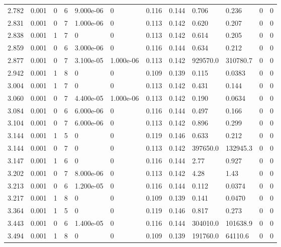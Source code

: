 \documentclass[preview]{standalone}
\begin{document}
{{{\begin{tabular}{L{1.2cm}C{1.2cm} C{0.3cm}C{0.5cm} C{1.4cm}C{1.4cm} C{1.4cm}C{1.4cm} C{1.6cm}C{1.6cm} C{1.6cm}C{1.6cm}}
  2.782  &  0.001  & 0     &  6 &  9.000e-06  & 0  &  0.116&   0.144& 0.706 & 0.236   &  0 & 0  \\ 
  2.831  &  0.001  & 0     &  7 &  1.000e-06  & 0  &  0.113&   0.142& 0.620 & 0.207   &  0 & 0  \\ 
  2.838  &  0.001  & 1     &  7 &  0  & 0  &  0.113&   0.142& 0.614 & 0.205   &  0 & 0  \\ 
  2.859  &  0.001  & 0     &  6 &  3.000e-06  & 0  &  0.116&   0.144& 0.634 & 0.212   &  0 & 0  \\ 
  2.877  &  0.001  & 0     &  7 &  3.100e-05  & 1.000e-06  &  0.113&   0.142& 929570.0 & 310780.7   &  0 & 0  \\ 
  2.942  &  0.001  & 1     &  8 &  0  & 0  &  0.109&   0.139& 0.115 & 0.0383   &  0 & 0  \\ 
  3.004  &  0.001  & 1     &  7 &  0  & 0  &  0.113&   0.142& 0.431 & 0.144   &  0 & 0  \\ 
  3.060  &  0.001  & 0     &  7 &  4.400e-05  & 1.000e-06  &  0.113&   0.142& 0.190 & 0.0634   &  0 & 0  \\ 
  3.084  &  0.001  & 0     &  6 &  6.000e-06  & 0  &  0.116&   0.144& 0.497 & 0.166   &  0 & 0  \\ 
  3.104  &  0.001  & 0     &  7 &  6.000e-06  & 0  &  0.113&   0.142& 0.896 & 0.299   &  0 & 0  \\ 
  3.144  &  0.001  & 1     &  5 &  0  & 0  &  0.119&   0.146& 0.633 & 0.212   &  0 & 0  \\ 
  3.144  &  0.001  & 0     &  7 &  0  & 0  &  0.113&   0.142& 397650.0 & 132945.3   &  0 & 0  \\ 
  3.147  &  0.001  & 1     &  6 &  0  & 0  &  0.116&   0.144& 2.77 & 0.927   &  0 & 0  \\ 
  3.202  &  0.001  & 0     &  7 &  8.000e-06  & 0  &  0.113&   0.142& 4.28 & 1.43   &  0 & 0  \\ 
  3.213  &  0.001  & 0     &  6 &  1.200e-05  & 0  &  0.116&   0.144& 0.112 & 0.0374   &  0 & 0  \\ 
  3.217  &  0.001  & 1     &  8 &  0  & 0  &  0.109&   0.139& 0.141 & 0.0470   &  0 & 0  \\ 
  3.364  &  0.001  & 1     &  5 &  0  & 0  &  0.119&   0.146& 0.817 & 0.273   &  0 & 0  \\ 
  3.443  &  0.001  & 0     &  6 &  1.400e-05  & 0  &  0.116&   0.144& 304010.0 & 101638.9   &  0 & 0  \\ 
  3.494  &  0.001  & 1     &  8 &  0  & 0  &  0.109&   0.139& 191760.0 & 64110.6   &  0 & 0  \\ 

\end{tabular}}}}
\end{document}
